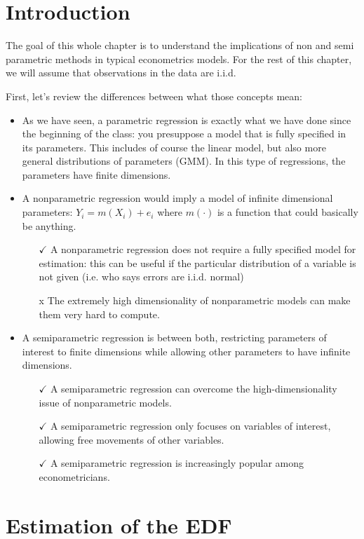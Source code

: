 \section{Introduction}

The goal of this whole chapter is to understand the implications of non and semi parametric methods in typical econometrics models. For the rest of this chapter, we will assume that observations in the data are i.i.d.

First, let's review the differences between what those concepts mean:\begin{itemize}
\item As we have seen, a parametric regression is exactly what we have done since the beginning of the class: you presuppose a model that is fully specified in its parameters. This includes of course the linear model, but also more general distributions of parameters (GMM). In this type of regressions, the parameters have finite dimensions.
\item A nonparametric regression would imply a model of infinite dimensional parameters: $Y_i = m(X_i) + e_i$ where $m(\cdot)$ is a function that could basically be anything.\begin{itemize}
\item[$\checkmark$] A nonparametric regression does not require a fully specified model for estimation: this can be useful if the particular distribution of a variable is not given (i.e. who says errors are i.i.d. normal)
\item[x] The extremely high dimensionality of nonparametric models can make them very hard to compute.
\end{itemize}
\item A semiparametric regression is between both, restricting parameters of interest to finite dimensions while allowing other parameters to have infinite dimensions.\begin{itemize}
\item[$\checkmark$] A semiparametric regression can overcome the high-dimensionality issue of nonparametric models.
\item[$\checkmark$] A semiparametric regression only focuses on variables of interest, allowing free movements of other variables.
\item[$\checkmark$] A semiparametric regression is increasingly popular among econometricians.
\end{itemize}
\end{itemize}

\section{Estimation of the EDF}

